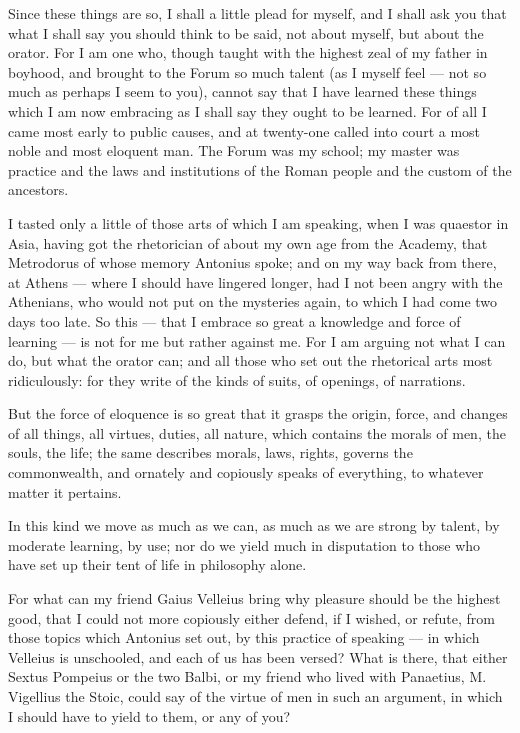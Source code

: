  Since these things are so, I shall a little plead for myself, and I shall ask you that what I shall say you should think to be said, not about myself, but about the orator. For I am one who, though taught with the highest zeal of my father in boyhood, and brought to the Forum so much talent (as I myself feel — not so much as perhaps I seem to you), cannot say that I have learned these things which I am now embracing as I shall say they ought to be learned. For of all I came most early to public causes, and at twenty-one called into court a most noble and most eloquent man. The Forum was my school; my master was practice and the laws and institutions of the Roman people and the custom of the ancestors.

 I tasted only a little of those arts of which I am speaking, when I was quaestor in Asia, having got the rhetorician of about my own age from the Academy, that Metrodorus of whose memory Antonius spoke; and on my way back from there, at Athens — where I should have lingered longer, had I not been angry with the Athenians, who would not put on the mysteries again, to which I had come two days too late. So this — that I embrace so great a knowledge and force of learning — is not for me but rather against me. For I am arguing not what I can do, but what the orator can; and all those who set out the rhetorical arts most ridiculously: for they write of the kinds of suits, of openings, of narrations.

 But the force of eloquence is so great that it grasps the origin, force, and changes of all things, all virtues, duties, all nature, which contains the morals of men, the souls, the life; the same describes morals, laws, rights, governs the commonwealth, and ornately and copiously speaks of everything, to whatever matter it pertains.

 In this kind we move as much as we can, as much as we are strong by talent, by moderate learning, by use; nor do we yield much in disputation to those who have set up their tent of life in philosophy alone.

 For what can my friend Gaius Velleius bring why pleasure should be the highest good, that I could not more copiously either defend, if I wished, or refute, from those topics which Antonius set out, by this practice of speaking — in which Velleius is unschooled, and each of us has been versed? What is there, that either Sextus Pompeius or the two Balbi, or my friend who lived with Panaetius, M. Vigellius the Stoic, could say of the virtue of men in such an argument, in which I should have to yield to them, or any of you?

